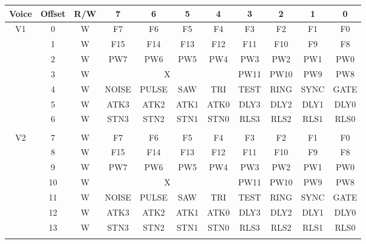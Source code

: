 \begin{table}[h]
	\begin{center}
		\begin{tabular}{|c|c|c|c|c|c|c|c|c|c|c|} \hline
			Voice & Offset & R/W & 7 & 6 & 5 & 4 & 3 & 2 & 1 & 0 \\ \hline\hline
            \multirow{7}{*}{V1} & 0 & W & F7 & F6 & F5 & F4 & F3 & F2 & F1 & F0 \\ \cline{2-11}
            & 1 & W & F15 & F14 & F13 & F12 & F11 & F10 & F9 & F8 \\ \cline{2-11}
            & 2 & W & PW7 & PW6 & PW5 & PW4 & PW3 & PW2 & PW1 & PW0 \\ \cline{2-11}
            & 3 & W & \multicolumn{4}{|c|}{X} & PW11 & PW10 & PW9 & PW8 \\ \cline{2-11}
            & 4 & W & NOISE & PULSE & SAW & TRI & TEST & RING & SYNC & GATE \\ \cline{2-11}
            & 5 & W & ATK3 & ATK2 & ATK1 & ATK0 & DLY3 & DLY2 & DLY1 & DLY0 \\ \cline{2-11}
            & 6 & W & STN3 & STN2 & STN1 & STN0 & RLS3 & RLS2 & RLS1 & RLS0 \\ \hline

            \multicolumn{11}{c}{} \\ \hline

            \multirow{7}{*}{V2} & 7 & W & F7 & F6 & F5 & F4 & F3 & F2 & F1 & F0\\ \cline{2-11}
            & 8 & W & F15 & F14 & F13 & F12 & F11 & F10 & F9 & F8 \\ \cline{2-11}
            & 9 & W & PW7 & PW6 & PW5 & PW4 & PW3 & PW2 & PW1 & PW0 \\ \cline{2-11}
            & 10 & W & \multicolumn{4}{|c|}{X} & PW11 & PW10 & PW9 & PW8 \\ \cline{2-11}
            & 11 & W & NOISE & PULSE & SAW & TRI & TEST & RING & SYNC & GATE \\ \cline{2-11}
            & 12 & W & ATK3 & ATK2 & ATK1 & ATK0 & DLY3 & DLY2 & DLY1 & DLY0 \\ \cline{2-11}
            & 13 & W & STN3 & STN2 & STN1 & STN0 & RLS3 & RLS2 & RLS1 & RLS0 \\ \hline

            \multicolumn{11}{c}{} \\ \hline


\end{tabular}
\end{center}
\end{table}
